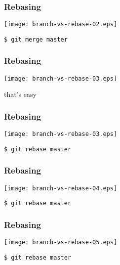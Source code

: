 \documentclass[english]{beamer}
\newcommand{\CMD}[1]{%
\texttt{\textcolor{code-green}{#1}}%
}
\begin{document}
\begin{frame}
\frametitle{Rebasing}

\texttt{[image: branch-vs-rebase-02.eps]}
\vspace{\baselineskip}
\begin{flushleft}
        \CMD{\$ git merge master}
\end{flushleft}
\vspace{\textheight}
\end{frame}

\begin{frame}
\frametitle{Rebasing}

\texttt{[image: branch-vs-rebase-03.eps]}
\vspace{\baselineskip}
\begin{center}
        that's easy
\end{center}
\vspace{\textheight}
\end{frame}

\begin{frame}
\frametitle{Rebasing}

\texttt{[image: branch-vs-rebase-03.eps]}
\vspace{\baselineskip}
\begin{flushright}
        \CMD{\$ git rebase master}
\end{flushright}
\vspace{\textheight}
\end{frame}

\begin{frame}
\frametitle{Rebasing}

\texttt{[image: branch-vs-rebase-04.eps]}
\vspace{\baselineskip}
\begin{flushright}
        \CMD{\$ git rebase master}
\end{flushright}
\vspace{\textheight}
\end{frame}

\begin{frame}
\frametitle{Rebasing}

\texttt{[image: branch-vs-rebase-05.eps]}
\vspace{\baselineskip}
\begin{flushright}
        \CMD{\$ git rebase master}
\end{flushright}
\vspace{\textheight}
\end{frame}
\end{document}
